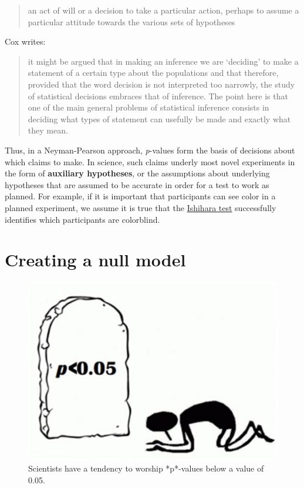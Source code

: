\documentclass[
]{krantz}
\begin{document}
\begin{quote}
an act of will or a decision to take a particular action, perhaps to assume a particular attitude towards the various sets of hypotheses
\end{quote}

Cox \citeyearpar{cox_problems_1958} writes:

\begin{quote}
it might be argued that in making an inference we are `deciding' to make a statement of a certain type about the populations and that therefore, provided that the word decision is not interpreted too narrowly, the study of statistical decisions embraces that of inference. The point here is that one of the main general problems of statistical inference consists in deciding what types of statement can usefully be made and exactly what they mean.
\end{quote}

Thus, in a Neyman-Pearson approach, \emph{p}-values form the basis of decisions about which claims to make. In science, such claims underly most novel experiments in the form of \textbf{auxiliary hypotheses}, or the assumptions about underlying hypotheses that are assumed to be accurate in order for a test to work as planned. For example, if it is important that participants can see color in a planned experiment, we assume it is true that the \href{https://en.wikipedia.org/wiki/Ishihara_test}{Ishihara test} successfully identifies which participants are colorblind.

\hypertarget{creating-a-null-model}{%
\section{Creating a null model}\label{creating-a-null-model}}

\begin{figure}

{\centering \includegraphics[width=0.25\linewidth]{images/worship} 

}

\caption{Scientists have a tendency to worship *p*-values below a value of 0.05.}\label{fig:worship}
\end{figure}
\end{document}
